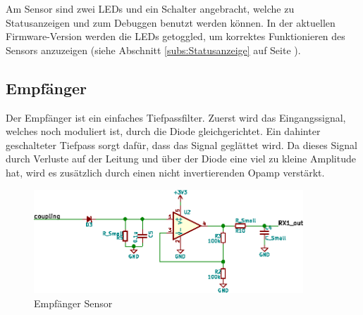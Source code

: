Am   Sensor  sind   zwei  LEDs   und  ein   Schalter  angebracht,   welche  zu
Statusanzeigen  und zum  Debuggen  benutzt werden  k\"onnen. In der  aktuellen
Firmware-Version  werden  die  LEDs   getoggled,  um  korrektes  Funktionieren
des  Sensors anzuzeigen  (siehe Abschnitt  \ref{subs:Statusanzeige} auf  Seite
\pageref{subs:Statusanzeige}).

\clearpage
\subsection{Empf\"anger}
\label{subsec:hw:sensor:receiver}

Der   Empf\"anger  ist   ein  einfaches   Tiefpassfilter.   Zuerst   wird  das
Eingangssignal,  welches  noch  moduliert   ist,  durch  die  Diode  
gleichgerichtet. Ein dahinter  geschalteter Tiefpass  sorgt daf\"ur,  dass das
Signal gegl\"attet wird. Da  dieses Signal durch Verluste auf  der Leitung und
\"uber der Diode eine viel zu kleine Amplitude hat, wird es zus\"atzlich durch
einen nicht invertierenden Opamp verst\"arkt.

\begin{figure}[h!t]
    \centering
    \includegraphics[width=0.9\textwidth]{images/sensor-sch/sensor--sch--receiver.eps}
    \caption[Sensor: Schema Empf\"anger]{Empf\"anger Sensor}
\end{figure}
